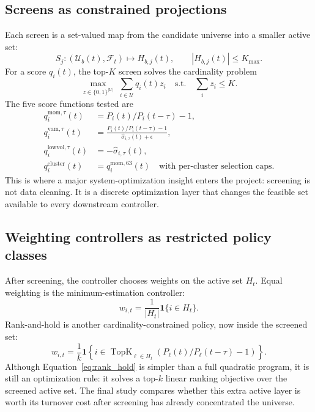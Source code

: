 \documentclass[journal,10pt]{IEEEtran}
\begin{document}
\subsection{Screens as constrained projections}
Each screen is a set-valued map from the candidate universe into a smaller active set:
\begin{equation}
S_j:\left(\mathcal{U}_b(t),\mathcal{F}_t\right)\mapsto H_{b,j}(t),\qquad |H_{b,j}(t)|\le K_{\max}.
\end{equation}
For a score $q_i(t)$, the top-$K$ screen solves the cardinality problem
\begin{equation}
\max_{z\in\{0,1\}^{|\mathcal{U}|}}\; \sum_{i\in\mathcal{U}} q_i(t)z_i
\quad\text{s.t.}\quad \sum_i z_i\le K.
\label{eq:topk}
\end{equation}
The five score functions tested are
\begin{align}
q_i^{\text{mom},\tau}(t) &= P_i(t)/P_i(t-\tau)-1,\\
q_i^{\text{vam},\tau}(t) &= \frac{P_i(t)/P_i(t-\tau)-1}{\widehat{\sigma}_{i,\tau}(t)+\epsilon},\\
q_i^{\text{lowvol},\tau}(t) &= -\widehat{\sigma}_{i,\tau}(t),\\
q_i^{\text{cluster}}(t) &= q_i^{\text{mom},63}(t)\quad\text{with per-cluster selection caps}.
\end{align}
This is where a major system-optimization insight enters the project: screening is not data cleaning. It is a discrete optimization layer that changes the feasible set available to every downstream controller.

\subsection{Weighting controllers as restricted policy classes}
After screening, the controller chooses weights on the active set $H_t$. Equal weighting is the minimum-estimation controller:
\begin{equation}
w_{i,t}=\frac{1}{|H_t|}\mathbf{1}\{i\in H_t\}.
\end{equation}
Rank-and-hold is another cardinality-constrained policy, now inside the screened set:
\begin{equation}
w_{i,t}=\frac{1}{k}\mathbf{1}\left\{i\in\operatorname{TopK}_{\ell\in H_t}\left(P_\ell(t)/P_\ell(t-\tau)-1\right)\right\}.
\label{eq:rank_hold}
\end{equation}
Although Equation~\eqref{eq:rank_hold} is simpler than a full quadratic program, it is still an optimization rule: it solves a top-$k$ linear ranking objective over the screened active set. The final study compares whether this extra active layer is worth its turnover cost after screening has already concentrated the universe.
\end{document}

